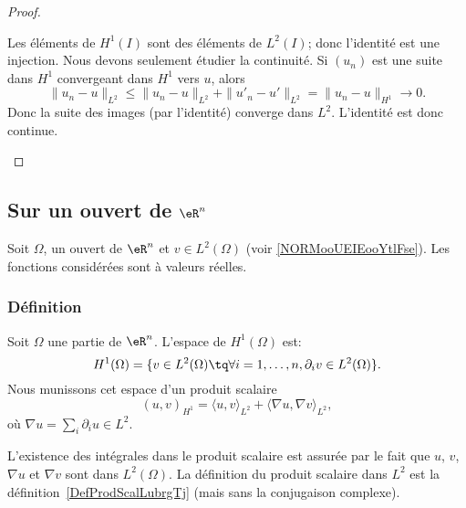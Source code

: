 \begin{proof}
\begin{enumerate}
		      Les éléments de \( H^1(I)\) sont des éléments de \( L^2(I)\); donc l'identité est une injection. Nous devons seulement étudier la continuité. Si \( (u_n)\) est une suite dans \( H^1\) convergeant dans \( H^1\) vers \( u\), alors
		      \begin{equation}
			      \| u_n-u \|_{L^2}\leq\| u_n-u \|_{L^2}+\| u'_n-u' \|_{L^2}=\| u_n-u \|_{H^1}\to 0.
		      \end{equation}
		      Donc la suite des images (par l'identité) converge dans \( L^2\). L'identité est donc continue.

	\end{enumerate}

\end{proof}

\subsection{Sur un ouvert de \( \eR^n\)}

Soit \( \Omega\), un ouvert de \( \eR^n\) et \( v\in L^2(\Omega)\) (voir \ref{NORMooUEIEooYtlFse}). Les fonctions considérées sont à valeurs réelles.


\subsubsection{Définition}

\begin{definition}
	Soit \( \Omega\) une partie de \( \eR^n\). L'espace de  \( H^1(\Omega)\) est:
	\begin{equation}
		H^1(\Omega)=\{ v\in L^2(\Omega)\tq \forall i=1,\ldots, n, \partial_iv\in L^2(\Omega) \}.
	\end{equation}
	Nous munissons cet espace d'un produit scalaire
	\begin{equation}        \label{EQooQRMKooLaMpcp}
		(u,v)_{H^1}=\langle u, v\rangle_{L^2}+\langle \nabla u, \nabla v\rangle_{L^2},
	\end{equation}
	où \( \nabla u=\sum_i\partial_iu\in L^2\).
\end{definition}
L'existence des intégrales dans le produit scalaire est assurée par le fait que \( u\), \( v\), \( \nabla u\) et \( \nabla v\) sont dans \( L^2(\Omega)\). La définition du produit scalaire dans \( L^2\) est la définition~\ref{DefProdScalLubrgTj} (mais sans la conjugaison complexe).


